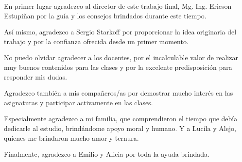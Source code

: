 \documentclass[
11pt, %
spanish,
singlespacing, %
parskip, %
headsepline, %
]{MastersDoctoralThesis} %
\begin{document}
\begin{acknowledgements}
\addchaptertocentry{\acknowledgementname} %
\vspace{1.5cm}

En primer lugar agradezco al director de este trabajo final, Mg. Ing. Ericson Estupiñan por la guía y los consejos brindados durante este tiempo.

Así mismo, agradezco a Sergio Starkoff por proporcionar la idea originaria del trabajo y por la confianza ofrecida desde un primer momento.

No puedo olvidar agradecer a los docentes, por el incalculable valor de realizar muy buenos contenidos para las clases y por la excelente predisposición para responder mis dudas.

Agradezco también a mis compañeros/as por demostrar mucho interés en las asignaturas y participar activamente en las clases.

Especialmente agradezco a mi familia, que comprendieron el tiempo que debía dedicarle al estudio, brindándome apoyo moral y humano. Y a Lucila y Alejo, quienes me brindaron mucho amor y ternura.

Finalmente, agradezco a Emilio y Alicia por toda la ayuda brindada.





\end{acknowledgements}


\tableofcontents %

\listoffigures %

\listoftables %




\end{document}
